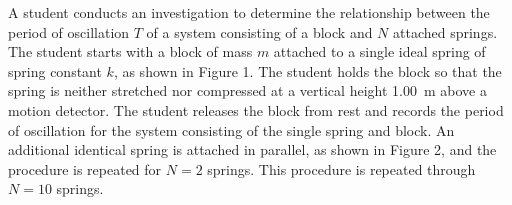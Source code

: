 \documentclass[12pt]{../../oss-apphys-exam}
\begin{document}
\begin{center}
\end{center}

\begin{questions}
  \question A student conducts an investigation to determine the relationship
  between the period of oscillation $T$ of a system consisting of a block and
  $N$ attached springs. The student starts with a block of mass $m$ attached
  to a single ideal spring of spring constant $k$, as shown in Figure 1. The
  student holds the block so that the spring is neither stretched nor
  compressed at a vertical height \SI{1.00}{\metre} above a motion detector.
  The student releases the block from rest and records the period of
  oscillation for the system consisting of the single spring and block. An
  additional identical spring is attached in parallel, as shown in Figure 2,
  and the procedure is repeated for $N=2$ springs. This procedure is repeated
  through $N=10$ springs.

\end{questions}
\end{document}
